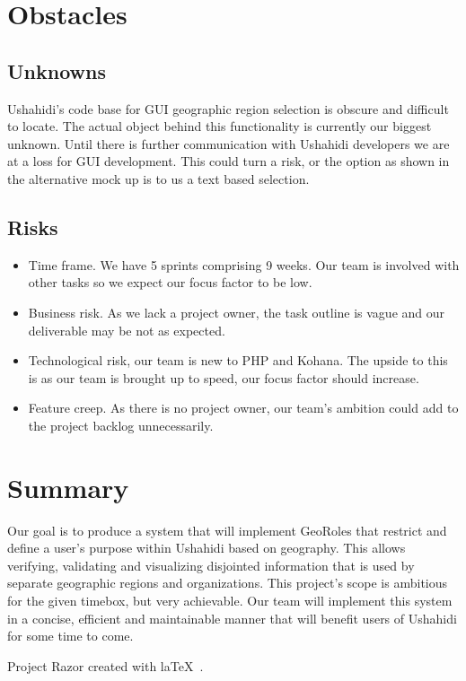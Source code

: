 \documentclass{article}
\begin{document}
\section{Obstacles}
\subsection{Unknowns}
Ushahidi's code base for GUI geographic region selection is obscure and difficult to locate. The actual object behind this functionality is currently our biggest unknown. Until there is further communication with Ushahidi developers we are at a loss for GUI development. This could turn a risk, or the option as shown in the alternative mock up is to us a text based selection.
\subsection{Risks}
\begin{itemize}
\item Time frame. We have 5 sprints comprising 9 weeks. Our team is involved with other tasks so we expect our focus factor to be low.
\item Business risk. As we lack a project owner, the task outline is vague and our deliverable may be not as expected.
\item Technological risk, our team is new to PHP and Kohana. The upside to this is as our team is brought up to speed, our focus factor should increase.
\item Feature creep. As there is no project owner, our team's ambition could add to the project backlog unnecessarily.
\end{itemize}

\section{Summary}
Our goal is to produce a system that will implement GeoRoles that restrict and define a user's purpose within Ushahidi based on geography. This allows verifying, validating and visualizing disjointed information that is used by separate geographic regions and organizations. This project's scope is ambitious for the given timebox, but very achievable. Our team will implement this system in a concise, efficient and maintainable manner that will benefit users of Ushahidi for some time to come. 
\vfill
\begin{center}
Project Razor created with la\TeX~.
\end{center}
\end{document}
